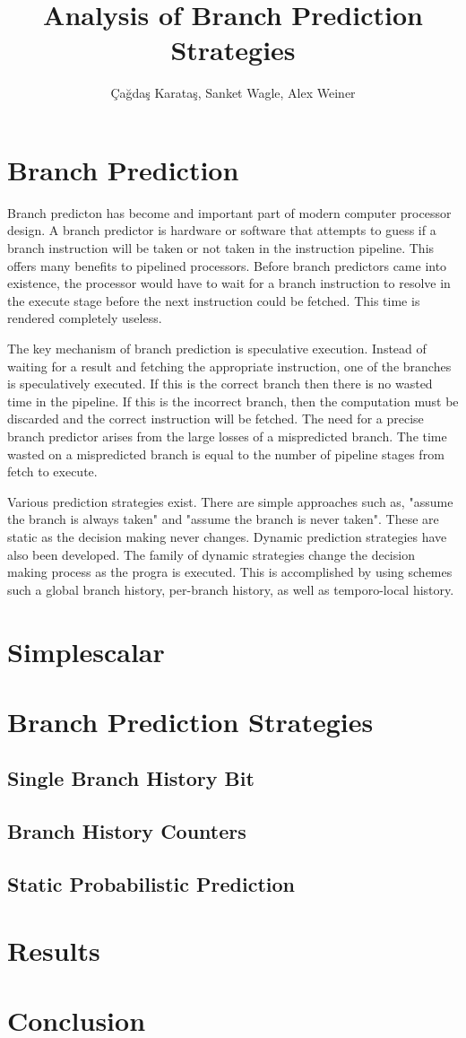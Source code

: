 \documentclass[12pt, twocolumn]{article}
\begin{document}
\author{\c{C}a\u{g}da\c{s} Karata\c{s}, Sanket Wagle, Alex Weiner}
\title{Analysis of Branch Prediction Strategies}
\maketitle

\section{Branch Prediction}
Branch predicton has become and important part of modern computer processor design. A branch predictor is hardware or software that attempts to guess if a branch instruction will be taken or not taken in the instruction pipeline. This offers many benefits to pipelined processors. Before branch predictors came into existence, the processor would have to wait for a branch instruction to resolve in the execute stage before the next instruction could be fetched. This time is rendered completely useless. 

The key mechanism of branch prediction is speculative execution. Instead of waiting for a result and fetching the appropriate instruction, one of the branches is speculatively executed. If this is the correct branch then there is no wasted time in the pipeline. If this is the incorrect branch, then the computation must be discarded and the correct instruction will be fetched. The need for a precise branch predictor arises from the large losses of a mispredicted branch. The time wasted on a mispredicted branch is equal to the number of pipeline stages from fetch to execute.

Various prediction strategies exist. There are simple approaches such as, "assume the branch is always taken" and "assume the branch is never taken". These are static as the decision making never changes. Dynamic prediction strategies have also been developed. The family of dynamic strategies change the decision making process as the progra is executed. This is accomplished by using schemes such a global branch history, per-branch history, as well as temporo-local history.

\section{Simplescalar}
\section{Branch Prediction Strategies}
\subsection{Single Branch History Bit}
\subsection{Branch History Counters}
\subsection{Static Probabilistic Prediction}
\section{Results}
\section{Conclusion}
\end{document}
